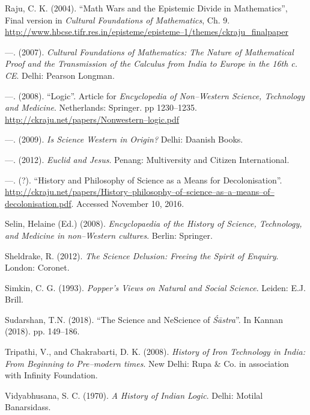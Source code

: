 \begin{thebibliography}{99}
  Raju, C. K. (2004). “Math Wars and the Epistemic Divide in Mathematics”, Final version in \textit{Cultural Foundations of Mathematics}, Ch. 9. \url{http://www.hbcse.tifr.res.in/episteme/episteme–1/themes/ckraju_finalpaper}

  —. (2007). \textit{Cultural Foundations of Mathematics: The Nature of Mathematical Proof and the Transmission of the Calculus from India to Europe in the 16th c. CE}. Delhi: Pearson Longman.

  —. (2008). “Logic”. Article for \textit{Encyclopedia of Non–Western Science, Technology and Medicine}. Netherlands: Springer. pp 1230–1235. \url{http://ckraju.net/papers/Nonwestern–logic.pdf}

  —. (2009). \textit{Is Science Western in Origin?} Delhi: Daanish Books.

  —. (2012). \textit{Euclid and Jesus}. Penang: Multiversity and Citizen International.

  —. (?). “History and Philosophy of Science as a Means for Decolonisation”. \url{http://ckraju.net/papers/History–philosophy–of–science–as–a–means–of–decolonisation.pdf}. Accessed November 10, 2016.

  Selin, Helaine (Ed.) (2008). \textit{Encyclopaedia of the History of Science, Technology, and Medicine in non–Western cultures}. Berlin: Springer.

  Sheldrake, R. (2012). \textit{The Science Delusion: Freeing the Spirit of Enquiry}. London: Coronet.

  Simkin, C. G. (1993). \textit{Popper's Views on Natural and Social Science}. Leiden: E.J. Brill.

  Sudarshan, T.N. (2018). “The Science and NeScience of \textit{Śāstra}”. In Kannan (2018). pp. 149–186.

  Tripathi, V., and Chakrabarti, D. K. (2008). \textit{History of Iron Technology in India: From Beginning to Pre–modern times}. New Delhi: Rupa \& Co. in association with Infinity Foundation.

  Vidyabhusana, S. C. (1970). \textit{A History of Indian Logic}. Delhi: Motilal Banarsidass.

 \end{thebibliography}

